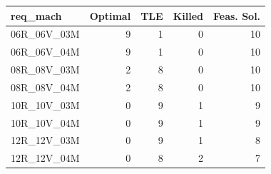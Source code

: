 
\begin{tabular}{lrrrr}
\toprule
req\_mach & Optimal & TLE & Killed & Feas. Sol.\\
\midrule
06R\_06V\_03M & 9 & 1 & 0 & 10\\
06R\_06V\_04M & 9 & 1 & 0 & 10\\
08R\_08V\_03M & 2 & 8 & 0 & 10\\
08R\_08V\_04M & 2 & 8 & 0 & 10\\
10R\_10V\_03M & 0 & 9 & 1 & 9\\
\addlinespace
10R\_10V\_04M & 0 & 9 & 1 & 9\\
12R\_12V\_03M & 0 & 9 & 1 & 8\\
12R\_12V\_04M & 0 & 8 & 2 & 7\\
\bottomrule
\end{tabular}
